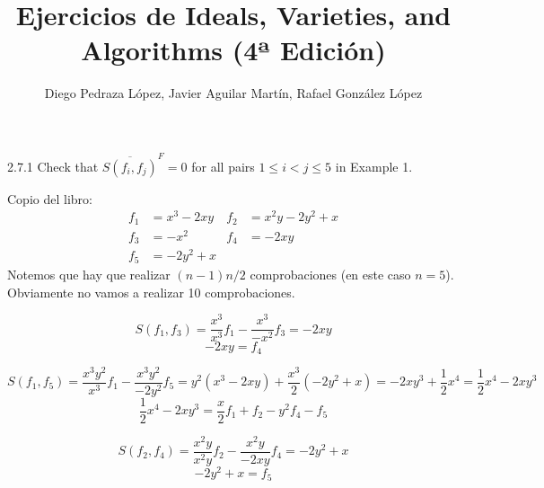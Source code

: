 \documentclass[twoside]{article}
\begin{document}
\title{Ejercicios de Ideals, Varieties, and Algorithms (4ª Edición)}
\author{Diego Pedraza López, Javier Aguilar Martín, Rafael González López}
\maketitle

\begin{ejercicio}{2.7.1}
Check that $\overline{S( f_i , f_j )}^F = 0$ for all pairs $1 ≤ i < j ≤ 5$ in Example 1.
\end{ejercicio}

\begin{solucion}
Copio del libro:
\begin{align*}
f_1 & = x^3-2xy & f_2 & = x^2y-2y^2+x\\
f_3 & = -x^2 & f_4 & = -2xy\\
f_5 & = -2y^2+x & &
\end{align*}
Notemos que hay que realizar $(n-1)n/2$ comprobaciones (en este caso $n=5$). Obviamente no vamos a realizar 10 comprobaciones.

\[ S(f_1, f_3) = \frac{x^3}{x^3}f_1 - \frac{x^3}{-x^2}f_3 = -2xy\]
\[ -2xy = f_4
\]


\[ S(f_1, f_5) = \frac{x^3y^2}{x^3}f_1 - \frac{x^3y^2}{-2y^2}f_5 = y^2(x^3-2xy)+\frac{x^3}{2}(-2y^2+x) = -2xy^3+\frac{1}{2}x^4 = \frac{1}{2}x^4-2xy^3\]
\[ \frac{1}{2}x^4-2xy^3 = \frac{x}{2}f_1+f_2 -y^2f_4-f_5 
\]

\[ S(f_2, f_4) = \frac{x^2y}{x^2y}f_2 - \frac{x^2y}{-2xy}f_4 = -2y^2+x\]
\[ -2y^2+x = f_5
\]


\end{solucion}

\newpage
\end{document}
